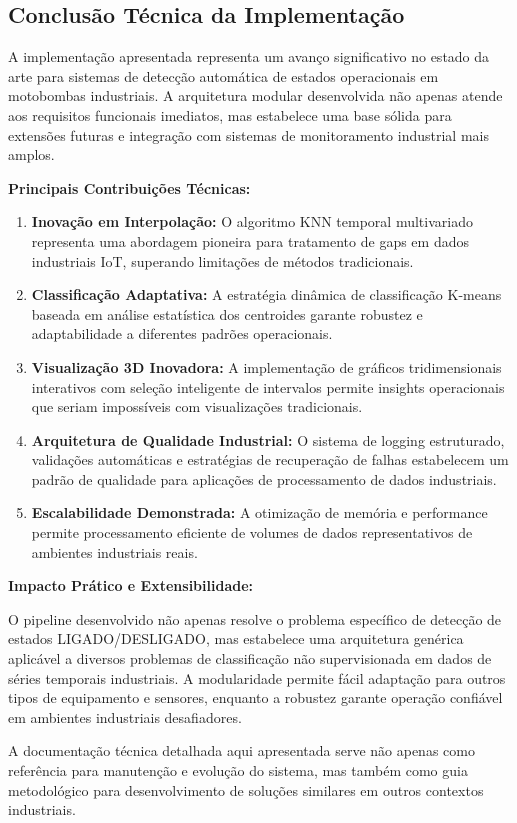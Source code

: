 \subsection{Conclusão Técnica da Implementação}

A implementação apresentada representa um avanço significativo no estado da arte para sistemas de detecção automática de estados operacionais em motobombas industriais. A arquitetura modular desenvolvida não apenas atende aos requisitos funcionais imediatos, mas estabelece uma base sólida para extensões futuras e integração com sistemas de monitoramento industrial mais amplos.

\textbf{Principais Contribuições Técnicas:}

\begin{enumerate}
    \item \textbf{Inovação em Interpolação:} O algoritmo KNN temporal multivariado representa uma abordagem pioneira para tratamento de gaps em dados industriais IoT, superando limitações de métodos tradicionais.

    \item \textbf{Classificação Adaptativa:} A estratégia dinâmica de classificação K-means baseada em análise estatística dos centroides garante robustez e adaptabilidade a diferentes padrões operacionais.

    \item \textbf{Visualização 3D Inovadora:} A implementação de gráficos tridimensionais interativos com seleção inteligente de intervalos permite insights operacionais que seriam impossíveis com visualizações tradicionais.

    \item \textbf{Arquitetura de Qualidade Industrial:} O sistema de logging estruturado, validações automáticas e estratégias de recuperação de falhas estabelecem um padrão de qualidade para aplicações de processamento de dados industriais.

    \item \textbf{Escalabilidade Demonstrada:} A otimização de memória e performance permite processamento eficiente de volumes de dados representativos de ambientes industriais reais.
\end{enumerate}

\textbf{Impacto Prático e Extensibilidade:}

O pipeline desenvolvido não apenas resolve o problema específico de detecção de estados LIGADO/DESLIGADO, mas estabelece uma arquitetura genérica aplicável a diversos problemas de classificação não supervisionada em dados de séries temporais industriais. A modularidade permite fácil adaptação para outros tipos de equipamento e sensores, enquanto a robustez garante operação confiável em ambientes industriais desafiadores.

A documentação técnica detalhada aqui apresentada serve não apenas como referência para manutenção e evolução do sistema, mas também como guia metodológico para desenvolvimento de soluções similares em outros contextos industriais.


